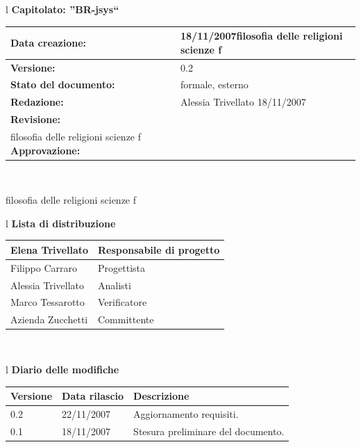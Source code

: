 \documentclass[11pt,titlepage,a4paper]{report}
\begin{document}
\begin{center}
\thispagestyle{plain}
\begin{table}[htbp]
\large{
\begin{tabular}{l}
\Large{\textbf{\textsf{Capitolato: ''BR-jsys``}}} \\
\begin{tabular}{||p{6cm}||p{6cm}||}
\hline
\textbf{Data creazione:} & 18/11/2007filosofia delle religioni scienze f \\
\hline
\textbf{Versione:} & 0.2 \\
\hline
\textbf{Stato del documento:} & formale, esterno \\
\hline
\textbf{Redazione:} & Alessia Trivellato ­18/11/2007 \\
\hline
\textbf{Revisione:} &    \\filosofia delle religioni scienze f
\hline
\textbf{Approvazione:}  & \\
\hline
\end{tabular} \\
\end{tabular}
}
\end{table}
filosofia delle religioni scienze f
\begin{table}[hbtp]
\large{
\begin{tabular}{l}
\Large{\textbf{\textsf{Lista di distribuzione}}} \\
\begin{tabular}{||p{6cm}||p{6cm}||}
\hline
{Elena Trivellato}& Responsabile di progetto \\ 
\hline 
{Filippo Carraro}& Progettista \\ 
\hline
{Alessia Trivellato}& Analisti \\
\hline
{Marco Tessarotto}& Verificatore \\
\hline
{Azienda Zucchetti}& Committente \\
\hline
\end{tabular} \\
\end{tabular}
}
\end{table}

\begin{table}[hbtp]
\large{
\begin{tabular}{l}
\Large{\textbf{\textsf{Diario delle modifiche}}} \\
\begin{tabular}{||p{2cm}||p{3.5cm}||p{6cm}||}
\hline
\textbf{Versione} & \textbf{Data rilascio} & \textbf{Descrizione} \\
\hline
0.2 & 22/11/2007 & Aggiornamento requisiti. \\
\hline
\hline
0.1 & 18/11/2007 & Stesura preliminare del documento. \\
\hline

\end{tabular} \\
\end{tabular}

}
\end{table}
\end{center}
\newpage
\tableofcontents
\end{document}
